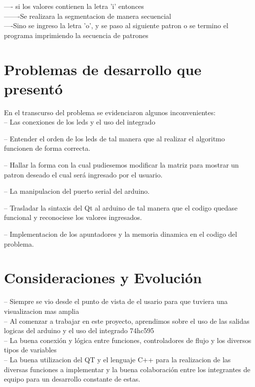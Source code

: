 \documentclass{article}
\begin{document}
---- si los valores contienen la letra 'i' entonces\\

-------Se realizara la segmentacion de manera secuencial\\

----Sino se ingreso la letra 'o', y se paso al siguiente patron o se termino el programa imprimiendo la secuencia de patrones

\section{Problemas de desarrollo que presentó}\label{contenido}

En el transcurso del problema se evidenciaron algunos inconvenientes: \\

-- Las conexiones de los leds y el uso del integrado 

-- Entender el orden de los leds de tal manera que al realizar el algoritmo funcionen de forma correcta.

-- Hallar la forma con la cual pudiesemos modificar la matriz para mostrar un patron deseado el cual será ingresado por el usuario.

-- La manipulacion del puerto serial del arduino.

-- Trasladar la sintaxis del Qt al arduino de tal manera que el codigo quedase funcional y reconociese los valores ingresados.

-- Implementacion de los apuntadores y la memoria dinamica en el codigo del problema.

\section{Consideraciones y Evolución}\label{contenido}

-- Siempre se vio desde el punto de vista de el usario para que tuviera una visualizacion mas amplia\\

-- Al comenzar a trabajar en este proyecto, aprendimos sobre el uso de las salidas logicas del arduino y el uso del integrado 74hc595\\

-- La buena conexión y lógica entre funciones,  controladores de flujo y los diversos tipos de variables\\

-- La buena utilizacion del QT y el lenguaje C++ para la realizacion de las diversas funciones a implementar y la buena colaboración entre los integrantes de equipo para un desarrollo constante de estas.
\end{document}

